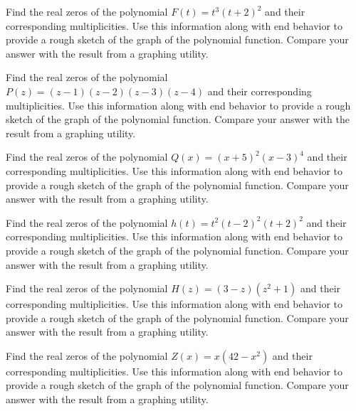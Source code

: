 \documentclass{ximera}
\begin{document}
\begin{problem}
Find the real zeros of the polynomial $F(t) = t^{3}(t+ 2)^{2}$ and their corresponding multiplicities.  Use this information along with end behavior to provide a rough sketch of the graph of the polynomial function.  Compare your answer with the result from a graphing utility.
\end{problem}

\begin{problem}
Find the real zeros of the polynomial $P(z) = (z- 1)(z - 2)(z - 3)(z - 4)$ and their corresponding multiplicities.  Use this information along with end behavior to provide a rough sketch of the graph of the polynomial function.  Compare your answer with the result from a graphing utility.
\end{problem}


\begin{problem}
Find the real zeros of the polynomial $Q(x) = (x + 5)^{2}(x - 3)^{4}$ and their corresponding multiplicities.  Use this information along with end behavior to provide a rough sketch of the graph of the polynomial function.  Compare your answer with the result from a graphing utility.
\end{problem}

\begin{problem}
Find the real zeros of the polynomial $h(t) = t^2(t-2)^2(t+2)^2$ and their corresponding multiplicities.  Use this information along with end behavior to provide a rough sketch of the graph of the polynomial function.  Compare your answer with the result from a graphing utility.
\end{problem}

\begin{problem}
Find the real zeros of the polynomial $H(z) = (3-z)(z^2+1)$ and their corresponding multiplicities.  Use this information along with end behavior to provide a rough sketch of the graph of the polynomial function.  Compare your answer with the result from a graphing utility.
\end{problem}

\begin{problem}\label{zeromultgraphlast}
Find the real zeros of the polynomial $Z(x) = x(42 - x^{2})$ and their corresponding multiplicities.  Use this information along with end behavior to provide a rough sketch of the graph of the polynomial function.  Compare your answer with the result from a graphing utility.
\end{problem}
\end{document}
